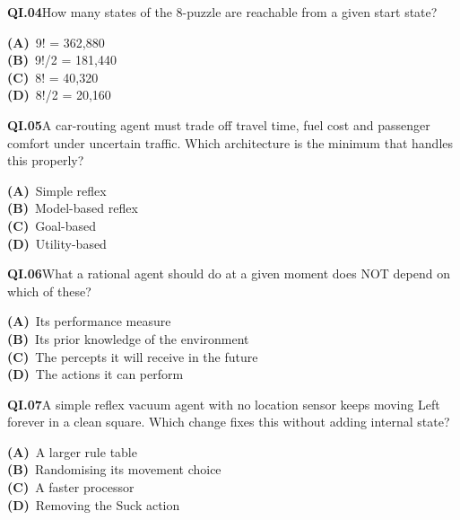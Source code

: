 \begin{tcolorbox}[enhanced,breakable,colback=white,colframe=navyL,arc=2mm,boxrule=0.7pt,left=3mm,right=3mm,top=2mm,bottom=2mm]
\textbf{\color{navy}QI.04}\quad How many states of the 8-puzzle are reachable from a given start state?\hfill{}\par\smallskip
{\small \textbf{\color{navyL}(A)}\ 9! = 362,880\\[1pt]\textbf{\color{navyL}(B)}\ 9!/2 = 181,440\\[1pt]\textbf{\color{navyL}(C)}\ 8! = 40,320\\[1pt]\textbf{\color{navyL}(D)}\ 8!/2 = 20,160}
\end{tcolorbox}
\begin{tcolorbox}[enhanced,breakable,colback=white,colframe=navyL,arc=2mm,boxrule=0.7pt,left=3mm,right=3mm,top=2mm,bottom=2mm]
\textbf{\color{navy}QI.05}\quad A car-routing agent must trade off travel time, fuel cost and passenger comfort under uncertain traffic. Which architecture is the minimum that handles this properly?\hfill{}\par\smallskip
{\small \textbf{\color{navyL}(A)}\ Simple reflex\\[1pt]\textbf{\color{navyL}(B)}\ Model-based reflex\\[1pt]\textbf{\color{navyL}(C)}\ Goal-based\\[1pt]\textbf{\color{navyL}(D)}\ Utility-based}
\end{tcolorbox}
\begin{tcolorbox}[enhanced,breakable,colback=white,colframe=navyL,arc=2mm,boxrule=0.7pt,left=3mm,right=3mm,top=2mm,bottom=2mm]
\textbf{\color{navy}QI.06}\quad What a rational agent should do at a given moment does NOT depend on which of these?\hfill{}\par\smallskip
{\small \textbf{\color{navyL}(A)}\ Its performance measure\\[1pt]\textbf{\color{navyL}(B)}\ Its prior knowledge of the environment\\[1pt]\textbf{\color{navyL}(C)}\ The percepts it will receive in the future\\[1pt]\textbf{\color{navyL}(D)}\ The actions it can perform}
\end{tcolorbox}
\begin{tcolorbox}[enhanced,breakable,colback=white,colframe=navyL,arc=2mm,boxrule=0.7pt,left=3mm,right=3mm,top=2mm,bottom=2mm]
\textbf{\color{navy}QI.07}\quad A simple reflex vacuum agent with no location sensor keeps moving Left forever in a clean square. Which change fixes this without adding internal state?\hfill{}\par\smallskip
{\small \textbf{\color{navyL}(A)}\ A larger rule table\\[1pt]\textbf{\color{navyL}(B)}\ Randomising its movement choice\\[1pt]\textbf{\color{navyL}(C)}\ A faster processor\\[1pt]\textbf{\color{navyL}(D)}\ Removing the Suck action}
\end{tcolorbox}
